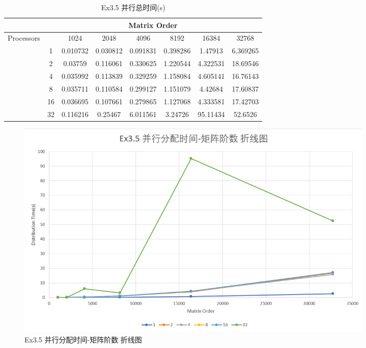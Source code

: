\documentclass[UTF8]{article}
\begin{document}
\begin{table}[h]
    \caption{Ex3.5 并行总时间(s)}
    \label{tab:my-table}
    \centering
    \scalebox{0.8} {
    \begin{tabular}{|c|c|c|c|c|c|c|c|}
    \hline
                                & \multicolumn{7}{c|}{Matrix Order}                                    \\ \hline
    \multirow{7}{*}{Processors} &    & 1024     & 2048     & 4096     & 8192     & 16384    & 32768    \\ \cline{2-8} 
                                & 1  & 0.010732 & 0.030812 & 0.091831 & 0.398286 & 1.47913  & 6.369265 \\ \cline{2-8} 
                                & 2  & 0.03759  & 0.116061 & 0.330625 & 1.220544 & 4.322531 & 18.69546 \\ \cline{2-8} 
                                & 4  & 0.035992 & 0.113839 & 0.329259 & 1.158084 & 4.605141 & 16.76143 \\ \cline{2-8} 
                                & 8  & 0.035711 & 0.110584 & 0.299127 & 1.151079 & 4.42684  & 17.60837 \\ \cline{2-8} 
                                & 16 & 0.036695 & 0.107661 & 0.279865 & 1.127068 & 4.333581 & 17.42703 \\ \cline{2-8} 
                                & 32 & 0.116216 & 0.25467  & 6.011561 & 3.24726  & 95.11434 & 52.6526  \\ \hline
    \end{tabular}}
    \end{table}


    \begin{figure}[h]
        \centering
        \includegraphics[width=0.85\textwidth]{35pdo.png}
        \caption{Ex3.5 并行分配时间-矩阵阶数 折线图}
    \end{figure}
\end{document}

